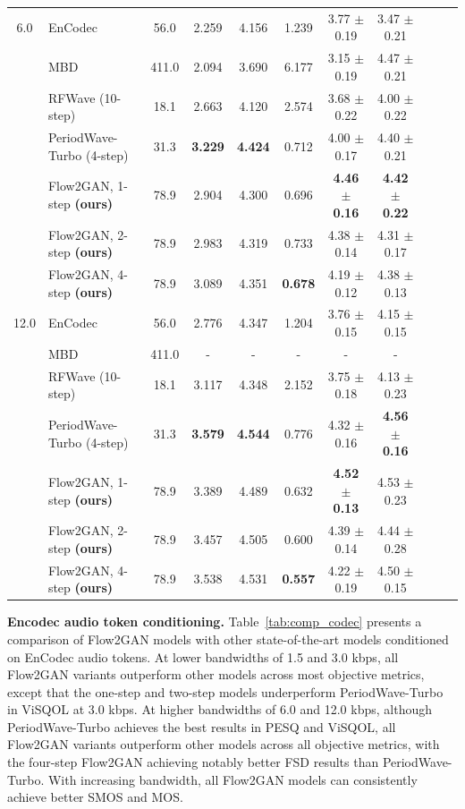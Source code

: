 \begin{table}[h]
{\begin{tabular}{c|l|c|cccccccc}
\midrule
6.0 & EnCodec & 56.0 & 2.259 & 4.156 & 1.239 & 3.77 $\pm$ 0.19 & 3.47 $\pm$ 0.21\\
 & MBD & 411.0 & 2.094 & 3.690 & 6.177 & 3.15 $\pm$ 0.19 & 4.47 $\pm$ 0.21\\
& RFWave (10-step) & 18.1 & 2.663 & 4.120 & 2.574 & 3.68 $\pm$ 0.22 & 4.00 $\pm$ 0.22\\
 & PeriodWave-Turbo (4-step) & 31.3 & \textbf{3.229} & \textbf{4.424} & 0.712 & 4.00 $\pm$ 0.17 & 4.40 $\pm$ 0.21\\
& Flow2GAN, 1-step \textbf{(ours)} & 78.9 & 2.904 & 4.300 & 0.696 & \textbf{4.46 $\pm$ 0.16} & \textbf{4.42 $\pm$ 0.22}\\
 & Flow2GAN, 2-step \textbf{(ours)} & 78.9 & 2.983 & 4.319 & 0.733 & 4.38 $\pm$ 0.14 & 4.31 $\pm$ 0.17\\
& Flow2GAN, 4-step \textbf{(ours)} & 78.9 & 3.089 & 4.351 & \textbf{0.678} & 4.19 $\pm$ 0.12 & 4.38 $\pm$ 0.13\\
\midrule
 12.0 & EnCodec & 56.0 & 2.776 & 4.347 & 1.204 & 3.76 $\pm$ 0.15 & 4.15 $\pm$ 0.15\\
& MBD & 411.0 & - & - & - & - & - \\
 & RFWave (10-step) & 18.1 & 3.117 & 4.348 & 2.152 & 3.75 $\pm$ 0.18 & 4.13 $\pm$ 0.23\\
& PeriodWave-Turbo (4-step) & 31.3 & \textbf{3.579} & \textbf{4.544} & 0.776 & 4.32 $\pm$ 0.16 & \textbf{4.56 $\pm$ 0.16}\\
 & Flow2GAN, 1-step \textbf{(ours)} & 78.9 & 3.389 & 4.489 & 0.632 & \textbf{4.52 $\pm$ 0.13} & 4.53 $\pm$ 0.23\\
& Flow2GAN, 2-step \textbf{(ours)}& 78.9 & 3.457 & 4.505 & 0.600 & 4.39 $\pm$ 0.14 & 4.44 $\pm$ 0.28 \\
 & Flow2GAN, 4-step \textbf{(ours)} & 78.9 & 3.538 & 4.531 & \textbf{0.557} & 4.22 $\pm$ 0.19 & 4.50 $\pm$ 0.15\\
\bottomrule
\end{tabular}
}
\vspace{-0.5em}
\end{table}

\noindent\textbf{Encodec audio token conditioning.} 
Table~\ref{tab:comp_codec} presents a comparison of Flow2GAN models with other state-of-the-art models conditioned on EnCodec audio tokens. 
At lower bandwidths of 1.5 and 3.0 kbps, all Flow2GAN variants outperform other models across most objective metrics, except that the one-step and two-step models underperform PeriodWave-Turbo~\citep{periodwave_turbo} in ViSQOL at 3.0 kbps. At higher bandwidths of 6.0 and 12.0 kbps, although PeriodWave-Turbo achieves the best results in PESQ and ViSQOL, all Flow2GAN variants outperform other models across all objective metrics, with the four-step Flow2GAN achieving notably better FSD results than PeriodWave-Turbo.
With increasing bandwidth, all Flow2GAN models can consistently achieve better SMOS and MOS.

